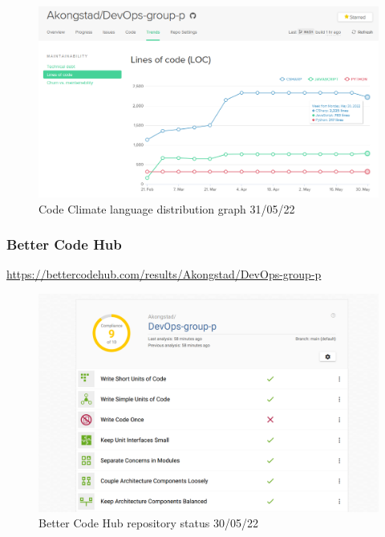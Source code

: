 \begin {figure}[H]
    \centering
    \includegraphics[scale=0.50]{images/analysis_tools/CodeClimateTrendsCode.PNG}
    \caption{Code Climate language distribution graph 31/05/22}
    \label{fig:codeClimateLangDis}
\end{figure}

\subsubsection{Better Code Hub}
\label{app:codeAnalHub}
\href{https://bettercodehub.com/results/Akongstad/DevOps-group-p}{https://bettercodehub.com/results/Akongstad/DevOps-group-p}

\begin {figure}[H]
    \centering
    \includegraphics[scale=0.45]{images/analysis_tools/analysis 9of10.PNG}
    \caption{Better Code Hub repository status 30/05/22}
    \label{fig:hubStatus}
\end{figure}


